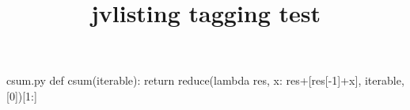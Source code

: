 \begin{filecontents}[noheader]{csum.py}
def csum(iterable):
return reduce(lambda res, x: res+[res[-1]+x], iterable, [0])[1:]
\end{filecontents}
\RequirePackage{luatagging}
\documentclass{article} 
\usepackage{jvlisting}

\title{jvlisting tagging test}


Some text
\begin{listing}
def csum(iterable):
return reduce(lambda res, x: res+[res[-1]+x], iterable, [0])[1:]
\end{listing}
more text
\begin{figure}[h]
\begin{listing}
def csum(iterable):
return reduce(lambda res, x: res+[res[-1]+x], iterable, [0])[1:]
\end{listing}
\caption{Some listing}
\end{figure}
Compare with:
\begin{verbatim}
def csum(iterable):
return reduce(lambda res, x: res+[res[-1]+x], iterable, [0])[1:]
\end{verbatim}
